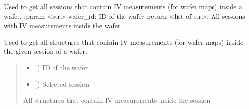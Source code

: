 \documentclass[letterpaper,10pt,english]{sphinxmanual}
\begin{document}

\begin{fulllineitems}
\label{\detokenize{getter:getter.get_map_sessions}}
\pysigstartsignatures
{}
\pysigstopsignatures
\sphinxAtStartPar
Used to get all sessions that contain I\sphinxhyphen{}V measurements (for wafer maps) inside a wafer.
:param \textless{}str\textgreater{} wafer\_id: ID of the wafer
:return \textless{}list of str\textgreater{}: All sessions with I\sphinxhyphen{}V measurements inside the wafer

\end{fulllineitems}


\begin{fulllineitems}
\label{\detokenize{getter:getter.get_map_structures}}
\pysigstartsignatures
{}
\pysigstopsignatures
\sphinxAtStartPar
Used to get all structures that contain I\sphinxhyphen{}V measurements (for wafer maps) inside the given session of a wafer.
\begin{quote}\begin{description}
\begin{itemize}
\item {} 
\sphinxAtStartPar
{} () \textendash{} ID of the wafer

\item {} 
\sphinxAtStartPar
{} () \textendash{} Selected session

\end{itemize}

\sphinxAtStartPar
All structures that contain I\sphinxhyphen{}V measurements inside the session

\end{description}\end{quote}

\end{fulllineitems}
\end{document}
